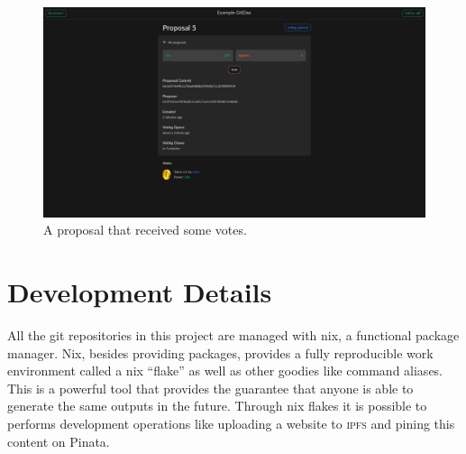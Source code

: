 \begin{figure}[ht!]
  \includegraphics[width=\linewidth]{images/demo/proposal_read_voted.png}
  \caption{\label{fig:demo_proposal_voted}A proposal that received some votes.}
\end{figure}

\section{Development Details}

%
All the git repositories in this project are managed with nix, a functional package manager.
Nix, besides providing packages, provides a fully reproducible work environment called a nix \enquote{flake} as well as other goodies like command aliases.
This is a powerful tool that provides the guarantee that anyone is able to generate the same outputs in the future.
Through nix flakes it is possible to performs development operations like uploading a website to \textsc{ipfs} and pining this content on Pinata.

